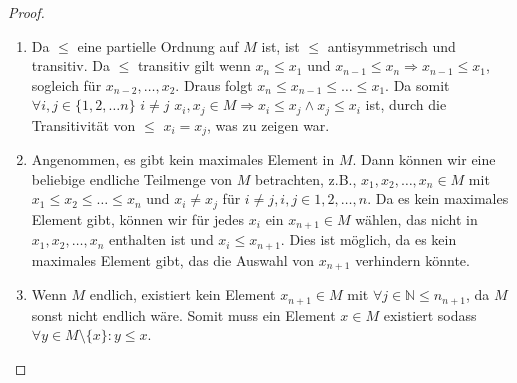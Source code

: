\documentclass{exam}
\begin{document}
\begin{proof}
    \leavevmode
    \begin{enumerate}[label=\roman*)]
        \item
              Da $\le$ eine partielle Ordnung auf $M$ ist, ist $\le$ antisymmetrisch und transitiv.
              Da $\le$ transitiv gilt wenn $x_n \le x_1$ und $x_{n-1} \le x_n \Rightarrow x_{n-1} \le x_1$, sogleich für $x_{n-2}, \dots, x_2$.
              Draus folgt $x_n \leq x_{n-1} \le \dots \le x_1$.
              Da somit $\forall i,j \in \{1,2,\dots n\}$ $i \ne j$ $x_i,x_j \in M \Rightarrow x_i \le x_j \land x_j \le x_i$ ist,
              durch die Transitivität von $\le$ $x_i = x_j$, was zu zeigen war.
              \checkmark
        \item
              Angenommen, es gibt kein maximales Element in $M$. Dann können wir eine beliebige endliche Teilmenge von $M$ betrachten, z.B., $x_1, x_2, \ldots, x_n \in M$ mit $x_1 \leq x_2 \leq \ldots \leq x_n$ und $x_i \neq x_j$ für $i \neq j, i, j \in {1, 2, \ldots, n}$.
              Da es kein maximales Element gibt, können wir für jedes $x_i$ ein $x_{n+1} \in M$ wählen, das nicht in ${x_1, x_2, \ldots, x_n}$ enthalten ist und $x_i \leq x_{n+1}$. Dies ist möglich, da es kein maximales Element gibt, das die Auswahl von $x_{n+1}$ verhindern könnte.
              \checkmark
        \item
              Wenn $M$ endlich, existiert kein Element $x_{n+1} \in M$ mit $\forall j \in \mathbb{N} \le n_{n+1}$, da $M$ sonst nicht endlich wäre.
              Somit muss ein Element $x \in M$ existiert sodass $\forall y \in M \setminus \{x\}: y \le x$.
              \checkmark
    \end{enumerate}
\end{proof}

\pagebreak
\end{document}
